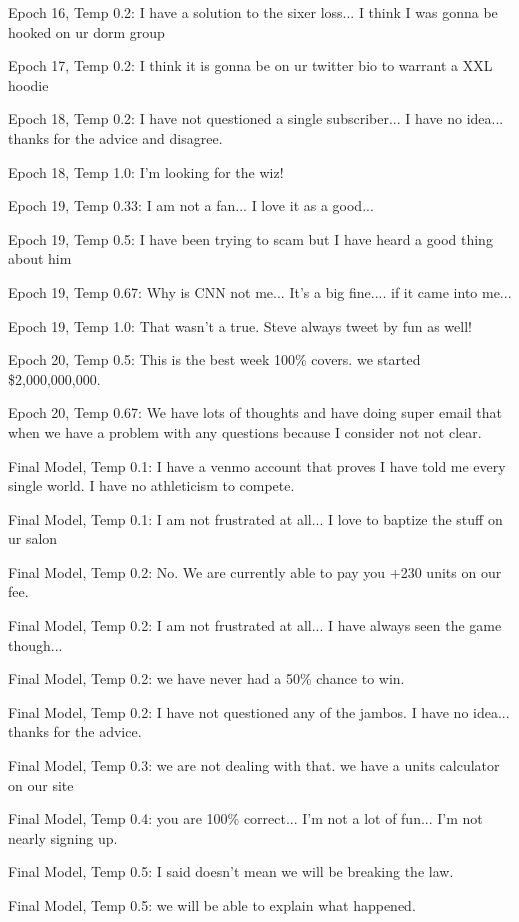 \documentclass[5p,authoryear]{elsarticle}
\begin{document}
Epoch 16, Temp 0.2:
I have a solution to the sixer loss... 
I think I was gonna be hooked on ur dorm group 

Epoch 17, Temp 0.2:
I think it is gonna be on ur twitter bio to warrant a XXL hoodie 

Epoch 18, Temp 0.2:
I have not questioned a single subscriber... I have no idea... thanks for the advice and disagree. 

Epoch 18, Temp 1.0:
I’m looking for the wiz! 

Epoch 19, Temp 0.33:
I am not a fan... I love it as a good...

Epoch 19, Temp 0.5:
I have been trying to scam but I have heard a good thing about him 

Epoch 19, Temp 0.67:
Why is CNN not me... It’s a big fine.... if it came into me... 

Epoch 19, Temp 1.0:
That wasn’t a true. Steve always tweet by fun as well!


Epoch 20, Temp 0.5:
This is the best week 100\% covers. we started \$2,000,000,000.

Epoch 20, Temp 0.67:
We have lots of thoughts and have doing super email that when we have a problem with any questions because I consider not not clear. 

Final Model, Temp 0.1: 
I have a venmo account that proves I have told me every single world. I have no athleticism to compete. 

Final Model, Temp 0.1: 
I am not frustrated at all... I love to baptize the stuff on ur salon

Final Model, Temp 0.2:
No. We are currently able to pay you +230 units on our fee. 

Final Model, Temp 0.2:
I am not frustrated at all... I have always seen the game though... 

Final Model, Temp 0.2:
we have never had a 50\% chance to win. 

Final Model, Temp 0.2:
I have not questioned any of the jambos. I have no idea... thanks for the advice. 

Final Model, Temp 0.3:
we are not dealing with that. we have a units calculator on our site 

Final Model, Temp 0.4:
you are 100\% correct... I’m not a lot of fun... I’m not nearly signing up. 

Final Model, Temp 0.5:
I said doesn’t mean we will be breaking the law.

Final Model, Temp 0.5:
we will be able to explain what happened. 
\end{document}
